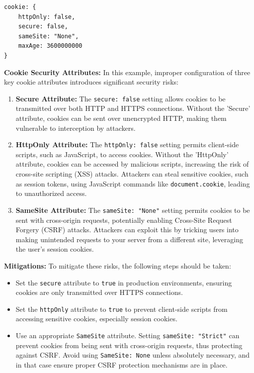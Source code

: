 \documentclass[]{article}
\begin{document}
\begin{lstlisting}
cookie: {
    httpOnly: false,
    secure: false,
    sameSite: "None",
    maxAge: 3600000000
}
\end{lstlisting}
\textbf{Cookie Security Attributes:}
In this example, improper configuration of three key cookie attributes introduces significant security risks:
\begin{enumerate}
\item \textbf{Secure Attribute:}
   The \texttt{secure: false} setting allows cookies to be transmitted over both HTTP and HTTPS connections. Without the 'Secure' attribute, cookies can be sent over unencrypted HTTP, making them vulnerable to interception by attackers.

\item \textbf{HttpOnly Attribute:} 
   The \texttt{httpOnly: false} setting permits client-side scripts, such as JavaScript, to access cookies. Without the 'HttpOnly' attribute, cookies can be accessed by malicious scripts, increasing the risk of cross-site scripting (XSS) attacks. Attackers can steal sensitive cookies, such as session tokens, using JavaScript commands like \texttt{document.cookie}, leading to unauthorized access.

\item \textbf{SameSite Attribute:}
   The \texttt{sameSite: "None"} setting permits cookies to be sent with cross-origin requests, potentially enabling Cross-Site Request Forgery (CSRF) attacks. Attackers can exploit this by tricking users into making unintended requests to your server from a different site, leveraging the user's session cookies.
\end{enumerate}
\textbf{Mitigations:}  
To mitigate these risks, the following steps should be taken:
\begin{itemize}
    \item Set the \texttt{secure} attribute to \texttt{true} in production environments, ensuring cookies are only transmitted over HTTPS connections.
    \item Set the \texttt{httpOnly} attribute to \texttt{true} to prevent client-side scripts from accessing sensitive cookies, especially session cookies.
    \item Use an appropriate \texttt{SameSite} attribute. Setting \texttt{sameSite: "Strict"} can prevent cookies from being sent with cross-origin requests, thus protecting against CSRF. Avoid using \texttt{SameSite: None} unless absolutely necessary, and in that case ensure proper CSRF protection mechanisms are in place.
\end{itemize}
\end{document}
